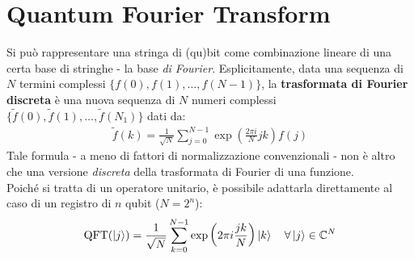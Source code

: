 \documentclass[../../InformazioneQuantistica.tex]{subfiles}
\begin{document}
\section{Quantum Fourier Transform}
Si può rappresentare una stringa di (qu)bit come combinazione lineare di una certa base di stringhe - la base \textit{di Fourier}. Esplicitamente, data una sequenza di $N$ termini complessi $\{f(0), f(1), \dots, f(N-1)\}$, la \textbf{trasformata di Fourier discreta} è una nuova sequenza di $N$ numeri complessi $\{\tilde{f}(0), \tilde{f}(1), \dots, \tilde{f}(N_1)\}$ dati da:
\begin{align}
    \tilde{f}(k) = \frac{1}{\sqrt{N}} \sum_{j=0}^{N-1} \exp\left( \frac{2\pi i}{N} jk \right) f(j)
    \label{eqn:cft}
\end{align}
Tale formula - a meno di fattori di normalizzazione convenzionali - non è altro che una versione \textit{discreta} della trasformata di Fourier di una funzione.\\

Poiché si tratta di un operatore unitario, è possibile adattarla direttamente al caso di un registro di $n$ qubit ($N=2^n$):
\begin{align}
\operatorname{QFT}(\Ket{j}) = \frac{1}{\sqrt{N}} \sum_{k=0}^{N-1} \exp\left(2\pi i \frac{jk}{N}\right) \Ket{k} \quad \forall \Ket{j} \in \mathbb{C}^N
\label{eqn:QFT1}
\end{align}
\end{document}
